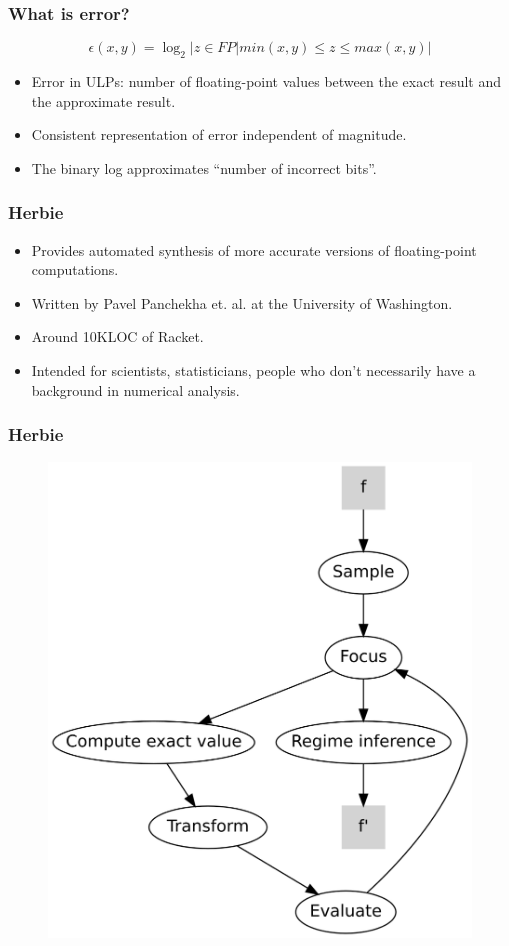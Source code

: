 \documentclass{beamer}
\begin{document}
\begin{frame}

\frametitle{What is error?}

\[\epsilon(x, y) = \log_2 | { z \in FP | min(x, y) \leq z \leq max(x,y) } |\]

\begin{itemize}
  \item Error in ULPs: number of floating-point values between the
    exact result and the approximate result\cite{schkufza2014}.
  \item Consistent representation of error independent of magnitude.
  \item The binary log approximates ``number of incorrect bits''.
\end{itemize}
\end{frame}

\begin{frame}
  \frametitle{Herbie}
  \begin{itemize}
  \item Provides automated synthesis of more accurate versions of
    floating-point computations\cite{panchekha2015}.
  \item Written by Pavel Panchekha et. al. at the University of Washington.
  \item Around 10KLOC of Racket.
  \item Intended for scientists, statisticians, people who don't
    necessarily have a background in numerical analysis.
  \end{itemize}
\end{frame}

\begin{frame}
  \frametitle{Herbie}
  \begin{figure}
    \includegraphics[scale=0.55]{img/loop.png}
  \end{figure}
\end{frame}
\end{document}
